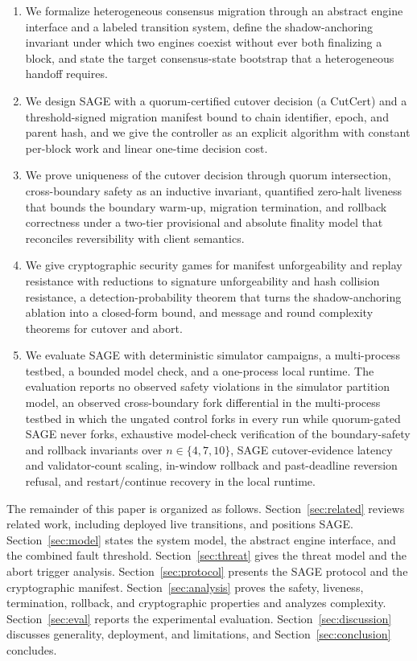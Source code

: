 \documentclass[journal]{IEEEtran}
\begin{document}
\begin{enumerate}
  \item We formalize heterogeneous consensus migration through an abstract engine interface
  and a labeled transition system, define the shadow-anchoring invariant under which two
  engines coexist without ever both finalizing a block, and state the target consensus-state
  bootstrap that a heterogeneous handoff requires.
  \item We design SAGE with a quorum-certified cutover decision (a CutCert) and a
  threshold-signed migration manifest bound to chain identifier, epoch, and parent hash, and
  we give the controller as an explicit algorithm with constant per-block work and linear
  one-time decision cost.
  \item We prove uniqueness of the cutover decision through quorum intersection,
  cross-boundary safety as an inductive invariant, quantified zero-halt liveness that bounds
  the boundary warm-up, migration termination, and rollback correctness under a two-tier
  provisional and absolute finality model that reconciles reversibility with client
  semantics.
  \item We give cryptographic security games for manifest unforgeability and replay
  resistance with reductions to signature unforgeability and hash collision resistance, a
  detection-probability theorem that turns the shadow-anchoring ablation into a closed-form
  bound, and message and round complexity theorems for cutover and abort.
  \item We evaluate SAGE with deterministic simulator campaigns, a
  multi-process testbed, a bounded model check, and a one-process local runtime. The
  evaluation reports no observed safety violations in the simulator partition
  model, an observed cross-boundary fork differential in the multi-process testbed in which the
  ungated control forks in every run while quorum-gated SAGE never forks, exhaustive model-check
  verification of the boundary-safety and rollback invariants over $n\in\{4,7,10\}$, SAGE
  cutover-evidence latency and validator-count scaling, in-window rollback and past-deadline
  reversion refusal, and restart/continue recovery in the local runtime.
\end{enumerate}

The remainder of this paper is organized as follows. Section~\ref{sec:related} reviews
related work, including deployed live transitions, and positions SAGE.
Section~\ref{sec:model} states the system model, the abstract engine interface, and the
combined fault threshold. Section~\ref{sec:threat} gives the threat model and the abort
trigger analysis. Section~\ref{sec:protocol} presents the SAGE protocol and the
cryptographic manifest. Section~\ref{sec:analysis} proves the safety, liveness,
termination, rollback, and cryptographic properties and analyzes complexity.
Section~\ref{sec:eval} reports the experimental evaluation. Section~\ref{sec:discussion}
discusses generality, deployment, and limitations, and Section~\ref{sec:conclusion}
concludes.
\end{document}
